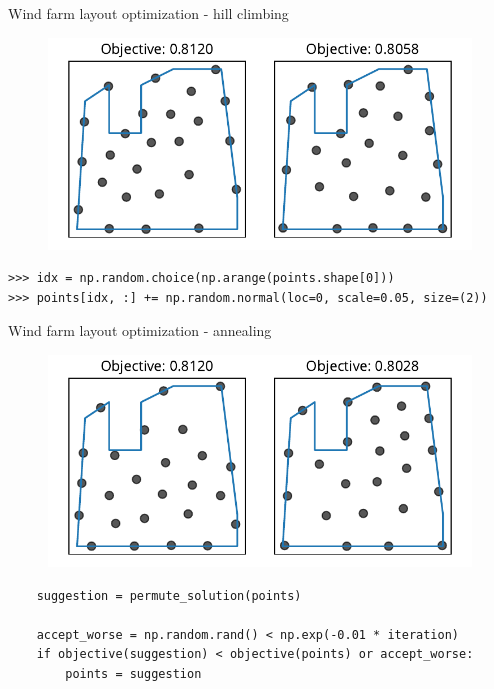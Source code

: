 \documentclass[12pt, aspectratio=149]{beamer}
\theoremstyle{plain}
\begin{document}
\begin{frame}[fragile]{Wind farm layout optimization - hill climbing}
\vspace*{-1em}
\begin{center}
 \begin{figure}
    	\centering
    	\includegraphics[width=0.99\linewidth]{figures/windfarm_hc}
 \end{figure}
 \end{center}
\vspace*{-2em}
\begin{center}
\begin{verbatim}
>>> idx = np.random.choice(np.arange(points.shape[0]))
>>> points[idx, :] += np.random.normal(loc=0, scale=0.05, size=(2))
\end{verbatim}
\end{center}
\end{frame}

\begin{frame}[fragile]{Wind farm layout optimization - annealing}
\vspace*{-1em}
\begin{center}
 \begin{figure}
    	\centering
    	\includegraphics[width=0.99\linewidth]{figures/windfarm_sa}
 \end{figure}
 \end{center}
\vspace*{-2em}
\begin{center}
\begin{verbatim}
    suggestion = permute_solution(points)

    accept_worse = np.random.rand() < np.exp(-0.01 * iteration)
    if objective(suggestion) < objective(points) or accept_worse:
        points = suggestion
\end{verbatim}
\end{center}
\end{frame}
\end{document}
